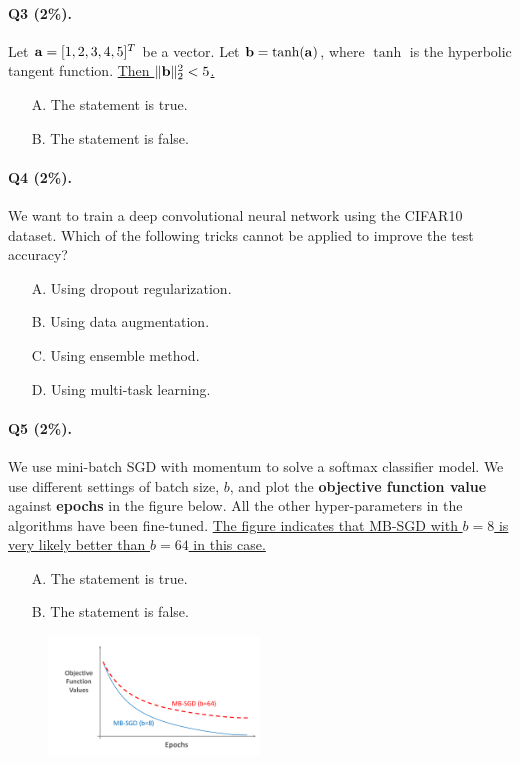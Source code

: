 \documentclass[11pt]{article}
\numberwithin{equation}{section}
\def\a{{\bf a}}
\def\bb{{\bf b}}
\begin{document}
\paragraph{Q3 (2\%).} 
Let $\a = [1, 2, 3, 4, 5]^T$ be a vector.
Let $\bb = \tanh (\a)$, where $\tanh$ is the hyperbolic tangent function.
\underline{Then $\| \bb \|_2^2 < 5$.}
\begin{itemize}
	\item[A.]
	The statement is true.
	\item[B.]
	The statement is false.
\end{itemize}


\paragraph{Q4 (2\%).} 
We want to train a deep convolutional neural network using the CIFAR10 dataset.
Which of the following tricks cannot be applied to improve the test accuracy?
\begin{itemize}
	\item[A.]
	Using dropout regularization.
	\item[B.]
	Using data augmentation.
	\item[C.]
	Using ensemble method.
	\item[D.]
	Using multi-task learning.
\end{itemize}


\paragraph{Q5 (2\%).} 
We use mini-batch SGD with momentum to solve a softmax classifier model.
We use different settings of batch size, $b$, and plot the \textbf{objective function value} against \textbf{epochs} in the figure below.
All the other hyper-parameters in the algorithms have been fine-tuned.
\underline{The figure indicates that MB-SGD with $b=8$ is very likely better than $b=64$ in this case.}
\begin{itemize}
	\item[A.]
	The statement is true.
	\item[B.]
	The statement is false.
\end{itemize}

\begin{figure}[h]
	\begin{center}
		\vspace{-5mm}
		\includegraphics[width=0.5\textwidth]{figure/epochs.pdf}
		\vspace{-4mm}
	\end{center}
\end{figure}
\end{document}
